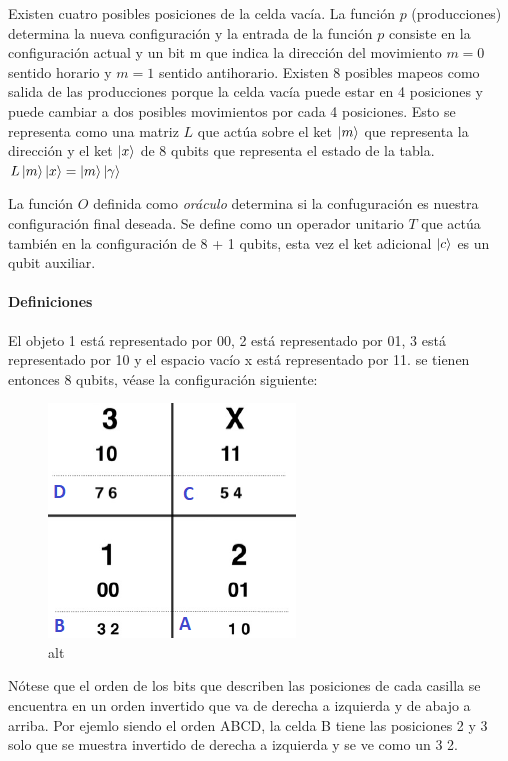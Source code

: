 \documentclass[11pt]{article}
\begin{document}
Existen cuatro posibles posiciones de la celda vacía. La función \(p\)
(producciones) determina la nueva configuración y la entrada de la
función \(p\) consiste en la configuración actual y un bit m que indica
la dirección del movimiento \(m=0\) sentido horario y \(m=1\) sentido
antihorario. Existen 8 posibles mapeos como salida de las producciones
porque la celda vacía puede estar en 4 posiciones y puede cambiar a dos
posibles movimientos por cada 4 posiciones. Esto se representa como una
matriz \(L\) que actúa sobre el ket \(\ket{m}\) que representa la
dirección y el ket \(\ket{x}\) de 8 qubits que representa el estado de
la tabla. \(L \ket{m}\ket{x} = \ket{m}\ket{\gamma}\)

La función \(O\) definida como \emph{oráculo} determina si la
confuguración es nuestra configuración final deseada. Se define como un
operador unitario \(T\) que actúa también en la configuración de 8 + 1
qubits, esta vez el ket adicional \(\ket{c}\) es un qubit auxiliar.

    \hypertarget{definiciones}{%
\paragraph{Definiciones}\label{definiciones}}

El objeto 1 está representado por 00, 2 está representado por 01, 3 está
representado por 10 y el espacio vacío x está representado por 11. se
tienen entonces 8 qubits, véase la configuración siguiente:

\begin{figure}
\centering
\includegraphics{config2puzzle.png}
\caption{alt}
\end{figure}

Nótese que el orden de los bits que describen las posiciones de cada
casilla se encuentra en un orden invertido que va de derecha a izquierda
y de abajo a arriba. Por ejemlo siendo el orden ABCD, la celda B tiene
las posiciones 2 y 3 solo que se muestra invertido de derecha a
izquierda y se ve como un 3 2.
\end{document}
